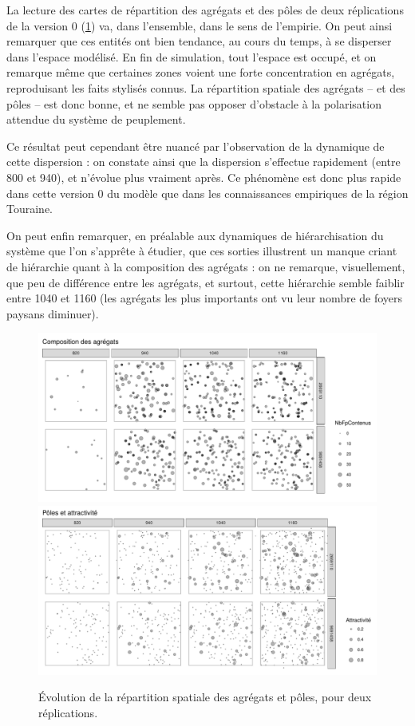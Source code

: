 \documentclass[12pt, a4paper, oneside]{book}
\begin{document}
	\begin{mdframed}[backgroundcolor=gray!10,footnoteinside=false]
		La lecture des cartes de répartition des agrégats et des pôles de deux réplications de la version 0 (\cref{fig:cartes-agregats-v0}) va, dans l'ensemble, dans le sens de l'empirie. On peut ainsi remarquer que ces entités ont bien tendance, au cours du temps, à se disperser dans l'espace modélisé. En fin de simulation, tout l'espace est occupé, et on remarque même que certaines zones voient une forte concentration en agrégats, reproduisant les faits stylisés connus. La répartition spatiale des agrégats -- et des pôles -- est donc bonne, et ne semble pas opposer d'obstacle à la polarisation attendue du système de peuplement.
		
		Ce résultat peut cependant être nuancé par l'observation de la dynamique de cette dispersion : on constate ainsi que la dispersion s'effectue rapidement (entre 800 et 940), et n'évolue plus vraiment après. Ce phénomène est donc plus rapide dans cette version 0 du modèle que dans les connaissances empiriques de la région Touraine.
		
		On peut enfin remarquer, en préalable aux dynamiques de hiérarchisation du système que l'on s'apprête à étudier, que ces sorties illustrent un manque criant de hiérarchie quant à la composition des agrégats : on ne remarque, visuellement, que peu de différence entre les agrégats, et surtout, cette hiérarchie semble faiblir entre 1040 et 1160 (les agrégats les plus importants ont vu leur nombre de foyers paysans diminuer).
	\end{mdframed}
	
	\begin{figure}[H]
		\captionsetup{width=\linewidth}
		\includegraphics[width=.47\linewidth]{img/resultats/v0_cartes_agregats.pdf}
		\includegraphics[width=.47\linewidth]{img/resultats/v0_cartes_poles.pdf}
		\caption{Évolution de la répartition spatiale des agrégats et pôles, pour deux réplications.} 
		\label{fig:cartes-agregats-v0} 
	\end{figure}
	
\end{document}
